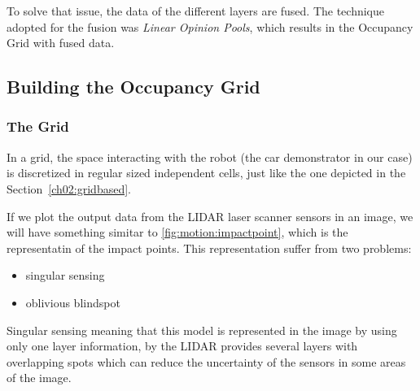 To solve that issue, the data of the different layers are fused. The technique adopted for the fusion was \textit{Linear Opinion Pools}, which results in the Occupancy Grid with fused data\cite{ADARVE-2012-671211}.

\subsection{Building the Occupancy Grid}


\subsubsection{The Grid}
\label{ch03:buildgrid:grid}

In a grid, the space interacting with the robot (the car demonstrator in our case) is discretized in regular sized independent cells, just like the one depicted in the Section~\ref{ch02:gridbased}.

If we plot the output data from the LIDAR laser scanner sensors in an image, we will have something simitar to \ref{fig:motion:impactpoint}, which is the representatin of the impact points. This representation suffer from two problems:

\begin{itemize}
\item singular sensing
\item oblivious blindspot 
\end{itemize}

Singular sensing meaning that this model is represented in the image by using only one layer information, by the LIDAR provides several layers with overlapping spots which can reduce the uncertainty of the sensors in some areas of the image. 

